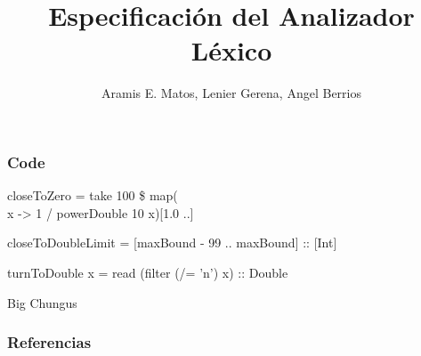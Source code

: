 \documentclass[14pt, aspectratio=169]{beamer}
\title{Especificación del Analizador Léxico}
\author{Aramis E. Matos, Lenier Gerena, Angel Berrios}
\begin{document}
\maketitle

\begin{frame}[fragile=singleslide]
    \frametitle{Code}
    \small
closeToZero = take 100 \$ map(\\x -> 1 / powerDouble 10 x)[1.0 ..]

closeToDoubleLimit = [maxBound - 99 .. maxBound] :: [Int]

turnToDouble x = read (filter (/= 'n') x) :: Double

\end{frame}

\begin{frame}{Big Chungus}
    \cite{narciso_farias_gramatica_2012}

    \cite{tapkeer_flex_2023}
\end{frame}

\begin{frame}[allowframebreaks]
    \frametitle{Referencias}
    
    
\end{frame}
\end{document}
